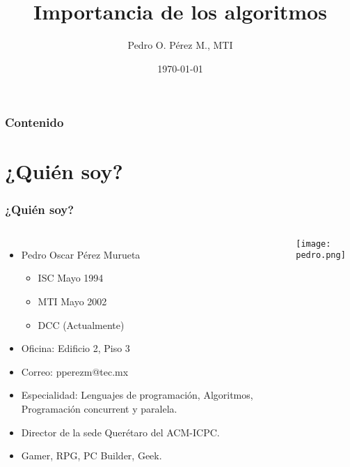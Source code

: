 \documentclass[aspectratio=169]{beamer}
\title[Algoritmos]{Importancia de los algoritmos} %
\author{Pedro O. Pérez M., MTI} %
\institute[Tecnológico de Monterrey] %
{
	Importancia de los algoritmos \\
	Tecnológico de Monterrey \\ %
	\medskip
	\textit{pperezm@tec.mx} %
}
\date{\specialdate\today} %
\begin{document}
\begin{frame}
\titlepage %
\end{frame}

\begin{frame}
\frametitle{Contenido} %
\tableofcontents %
\end{frame}


\section{¿Quién soy?} %

\begin{frame}
\frametitle{¿Quién soy?}
\begin{columns}[c] %
	
	\begin{itemize}
		\item Pedro Oscar Pérez Murueta
		\begin{itemize}
			\item ISC Mayo 1994
			\item MTI Mayo 2002
			\item DCC (Actualmente)
		\end{itemize}
		\item Oficina: Edificio 2, Piso 3
		\item Correo: pperezm@tec.mx
		\item Especialidad: Lenguajes de programación, Algoritmos, Programación concurrent y paralela.
		\item Director de la sede Querétaro del ACM-ICPC.
		\item Gamer, RPG, PC Builder, Geek.
	\end{itemize}
	
	\texttt{[image: pedro.png]}
	
\end{columns}
\end{frame}
\end{document}
